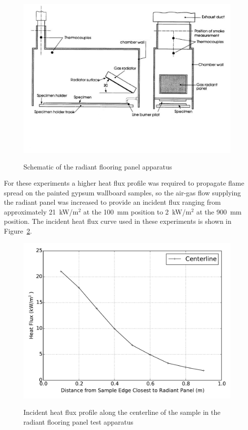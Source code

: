 \documentclass[twoside]{uocthesis}
\begin{document}
\begin{figure}
	\centering
	\includegraphics[width=\textwidth]{../Figures/FLR_Radpan} \\
	\caption[Schematic of the radiant flooring panel apparatus]{Schematic of the radiant flooring panel apparatus}
	\label{FLR_Radpan}
\end{figure}

 For these experiments a higher heat flux profile was required to propagate flame spread on the painted gypsum wallboard samples, so the air-gas flow supplying the radiant panel was increased to provide an incident flux ranging from approximately 21~kW/m$^2$ at the 100~mm position to 2~kW/m$^2$ at the 900~mm position.  The incident heat flux curve used in these experiments is shown in Figure~\ref{FRP_HF_Calibration}.   

\begin{figure}
	\centering
	\includegraphics[width=\textwidth]{../Figures/FRP_HF_Calibration} \\
	\caption[Incident heat flux profile in the radiant flooring panel test apparatus]{Incident heat flux profile along the centerline of the sample in the radiant flooring panel test apparatus}
	\label{FRP_HF_Calibration}
\end{figure}
\end{document}
